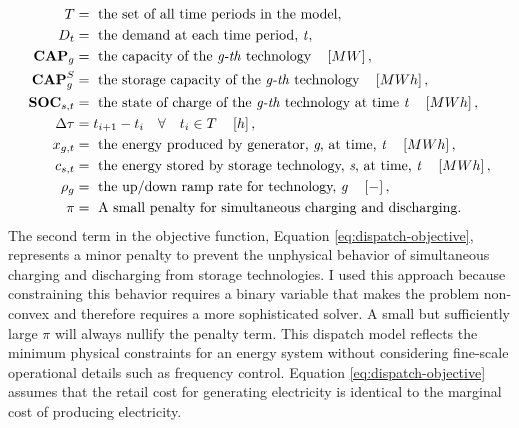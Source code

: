 \begin{align}
    T &= \text{ the set of all time periods in the model},\nonumber\\
    D_t &= \text{ the demand at each time period, \textit{t}},\nonumber\\
    \textbf{CAP}_g &= \text{ the capacity of the \textit{g-th} technology}\quad \left[MW\right],\nonumber\\
    \textbf{CAP}^S_g &= \text{ the storage capacity of the \textit{g-th} technology}\quad \left[MWh\right],\nonumber\\
    \textbf{SOC}_{s,t} &= \text{ the state of charge of the \textit{g-th} technology at time \textit{t}}\quad \left[MWh\right]\nonumber,\\
    \Delta\tau &= t_{i+1} - t_i \quad \forall \quad t_i \in T \quad \left[h\right],\nonumber\\
    x_{g,t} &= \text{ the energy produced by generator, \textit{g}, at time, \textit{t}}\quad \left[MWh\right]\nonumber,\\
    c_{s,t} &= \text{ the energy stored by storage technology, \textit{s}, at time, \textit{t}}\quad \left[MWh\right]\nonumber,\\
    \rho_g &= \text{ the up/down ramp rate for technology, \textit{g}} \quad \left[-\right]\nonumber,\\
    \pi &= \text{ A small penalty for simultaneous charging and discharging.}\nonumber
\end{align}
The second term in the objective function, Equation \ref{eq:dispatch-objective}, represents
a minor penalty to prevent the unphysical behavior of simultaneous charging and discharging
from storage technologies. I used this approach because constraining this behavior requires a
binary variable that makes the problem non-convex and therefore requires a more sophisticated solver. A small but sufficiently large $\pi$ will always nullify the penalty term. This dispatch model reflects the minimum physical constraints for an energy system without considering fine-scale operational details such as frequency control. Equation \ref{eq:dispatch-objective} assumes that the retail cost for
generating electricity is identical to the marginal cost of producing 
electricity. 